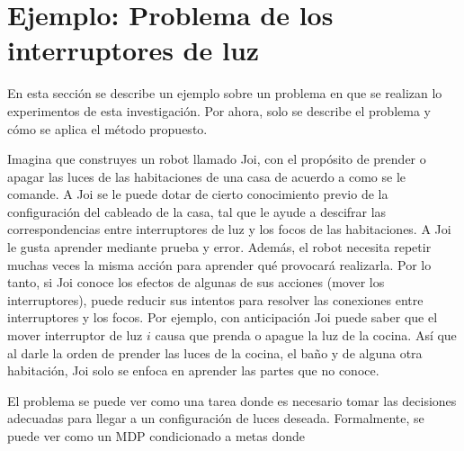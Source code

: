 \section{Ejemplo: Problema de los interruptores de luz}

En esta sección se describe un ejemplo sobre un problema en que se realizan 
lo experimentos de esta investigación. Por ahora, solo se describe el problema
y cómo se aplica el método propuesto.

Imagina que construyes un robot llamado Joi, con el propósito de prender o apagar las luces de las habitaciones 
de una casa de acuerdo a como se le comande.
A Joi se le puede dotar de cierto conocimiento previo de la configuración
del cableado de la casa, tal que le ayude a descifrar las correspondencias entre
interruptores de luz y los focos de las habitaciones. 
 A Joi le gusta aprender mediante prueba
 y error. Además, el robot 
 necesita repetir muchas veces la misma acción para aprender
 qué provocará realizarla. Por lo tanto, si Joi conoce los efectos de algunas de sus acciones (mover los interruptores), puede reducir sus intentos para
 resolver las conexiones entre interruptores y los focos. 
 Por ejemplo, con anticipación Joi puede saber que el mover interruptor de luz $i$ causa que
prenda o apague la luz de la cocina.
 Así que al darle la orden de prender las luces de la cocina, el baño y de alguna otra habitación, Joi solo se enfoca en aprender las partes que no
 conoce.
 
 El problema se puede ver como una tarea donde es necesario tomar las
 decisiones adecuadas para llegar a un configuración de luces deseada. Formalmente, se puede ver como un MDP condicionado a metas donde 
 
